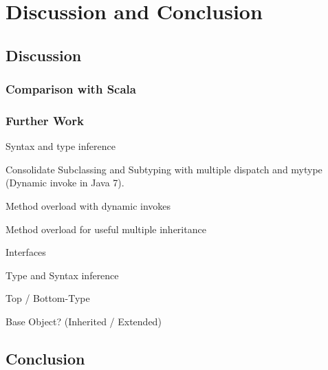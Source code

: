 \part{Discussion and Conclusion}
\chapter{Discussion}
\label{ctr:discussion}
\section{Comparison with Scala}
\label{sec:comparisonScala}

\section{Further Work}
\label{sec:furtherWork}
Syntax and type inference


Consolidate Subclassing and Subtyping with multiple dispatch and mytype (Dynamic invoke in Java 7).

Method overload with dynamic invokes

Method overload for useful multiple inheritance

Interfaces

Type and Syntax inference

Top / Bottom-Type

Base Object? (Inherited / Extended)


\chapter{Conclusion}
\label{ctr:conclusion}
